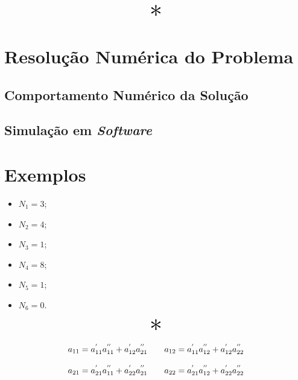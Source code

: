 \documentclass{report}
\let\oldsection\section
\renewcommand\section{\clearpage\oldsection}
\begin{document}
\begin{center}
  \[ \scalebox{3}{$ * $} \]
\end{center}

\section{Resolução Numérica do Problema}
\label{sec:numerical}
\subsection{Comportamento Numérico da Solução}
\subsection{Simulação em \textit{Software}}

\section{Exemplos}

\begin{itemize}
  \item $ N_1 = 3$;
  \item $ N_2 = 4$;
  \item $ N_3 = 1$;
  \item $ N_4 = 8$;
  \item $ N_5 = 1$;
  \item $ N_6 = 0$.
\end{itemize}

\begin{center}
  \[ \scalebox{3}{$ * $} \]
\end{center}

\begin{equation}
  \label{eq:quad_cascade}
  \centering
  \begin{matrix}
    a_{11} = a^{'}_{11}a^{''}_{11} + a^{'}_{12}a^{''}_{21} & \hspace{10pt} a_{12} = a^{'}_{11}a^{''}_{12} + a^{'}_{12}a^{''}_{22} \\\\
    a_{21} = a^{'}_{21}a^{''}_{11} + a^{'}_{22}a^{''}_{21} & \hspace{10pt} a_{22} = a^{'}_{21}a^{''}_{12} + a^{'}_{22}a^{''}_{22}
  \end{matrix}
\end{equation}
\end{document}
